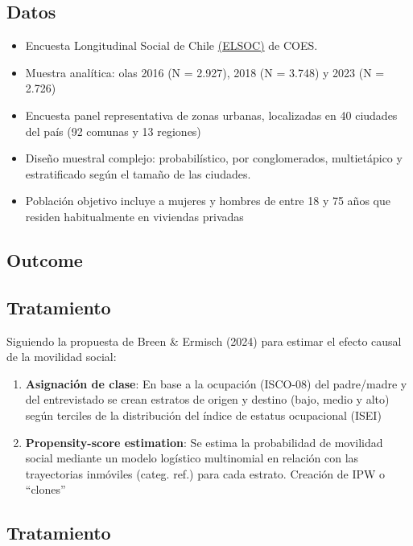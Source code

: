 \documentclass[
  spanish,
  letterpaper,
  DIV=11,
  numbers=noendperiod,
  oneside]{scrartcl}
\begin{document}
\subsection{Datos}\label{datos}

\begin{itemize}
\item
  Encuesta Longitudinal Social de Chile
  \href{https://coes.cl/elsoc/}{(ELSOC)} de COES.
\item
  Muestra analítica: olas 2016 (N = 2.927), 2018 (N = 3.748) y 2023 (N =
  2.726)
\item
  Encuesta panel representativa de zonas urbanas, localizadas en 40
  ciudades del país (92 comunas y 13 regiones)
\item
  Diseño muestral complejo: probabilístico, por conglomerados,
  multietápico y estratificado según el tamaño de las ciudades.
\item
  Población objetivo incluye a mujeres y hombres de entre 18 y 75 años
  que residen habitualmente en viviendas privadas
\end{itemize}

\subsection{Outcome}\label{outcome}

\subsection{Tratamiento}\label{tratamiento}

Siguiendo la propuesta de Breen \& Ermisch (2024) para estimar el efecto
causal de la movilidad social:

\begin{enumerate}
\def\labelenumi{\arabic{enumi}.}
\item
  \textbf{Asignación de clase}: En base a la ocupación (ISCO-08) del
  padre/madre y del entrevistado se crean estratos de origen y destino
  (bajo, medio y alto) según terciles de la distribución del índice de
  estatus ocupacional (ISEI)
\item
  \textbf{Propensity-score estimation}: Se estima la probabilidad de
  movilidad social mediante un modelo logístico multinomial en relación
  con las trayectorias inmóviles (categ. ref.) para cada estrato.
  Creación de IPW o ``clones''
\end{enumerate}

\subsection{Tratamiento}\label{tratamiento-1}
\end{document}

